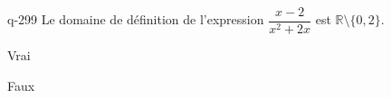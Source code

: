 \begin{truefalse}{q-299}
Le domaine de définition de l'expression $\dfrac{x-2}{x^2+2x}$ est $\mathbb R \setminus \{0,2\}$.
\item Vrai
\item* Faux
\end{truefalse}

